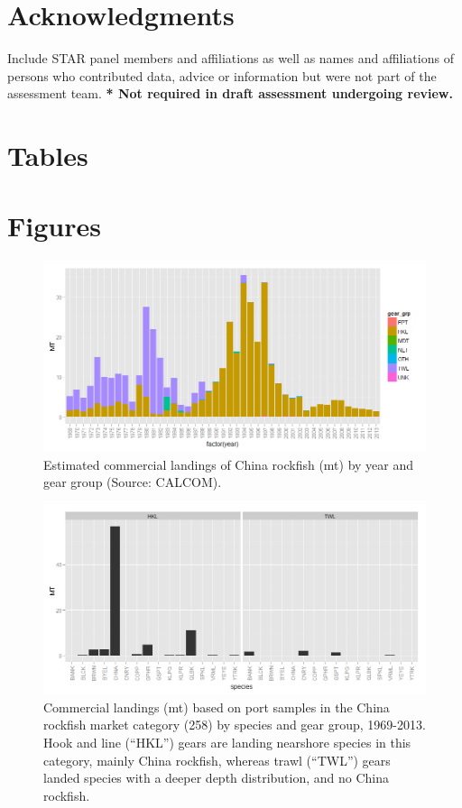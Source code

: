 \documentclass[12pt,]{article}
\begin{document}
\section{Acknowledgments}\label{acknowledgments}

Include STAR panel members and affiliations as well as names and
affiliations of persons who contributed data, advice or information but
were not part of the assessment team.
\textbf{* Not required in draft assessment undergoing review.}

\section{Tables}\label{tables}

\section{Figures}\label{figures}

\begin{figure}[htbp]
\centering
\includegraphics{plots/EJD_Unaltered_CALCOM_landings_by_year+gear.png}
\caption{Estimated commercial landings of China rockfish (mt) by year
and gear group (Source: CALCOM). \label{EJD_CALCOM_1}}
\end{figure}

\begin{figure}[htbp]
\centering
\includegraphics{plots/EJD_sp_comps_MC258_actuaL_samples_by_gear.png}
\caption{Commercial landings (mt) based on port samples in the China
rockfish market category (258) by species and gear group, 1969-2013.
Hook and line (``HKL'') gears are landing nearshore species in this
category, mainly China rockfish, whereas trawl (``TWL'') gears landed
species with a deeper depth distribution, and no China rockfish.
\label{EJD_CALCOM_2}}
\end{figure}
\end{document}
